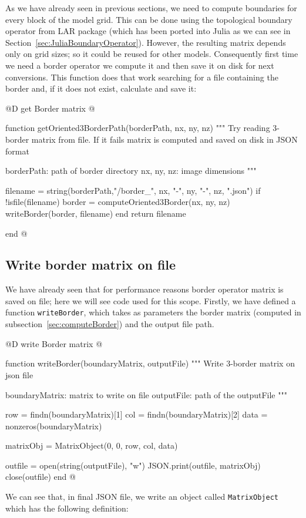 \documentclass[11pt,oneside]{article}	%
\begin{document}
As we have already seen in previous sections, we need to compute boundaries for every block of the model grid. This can be done using the topological boundary operator from LAR package (which has been ported into Julia as we can see in Section~\ref{sec:JuliaBoundaryOperator}). However, the resulting matrix depends only on grid sizes; so it could be reused for other models. Consequently first time we need a border operator we compute it and then save it on disk for next conversions. This function does that work searching for a file containing the border and, if it does not exist, calculate and save it: 

@D get Border matrix
@{function getOriented3BorderPath(borderPath, nx, ny, nz)
  """
  Try reading 3-border matrix from file. If it fails matrix
  is computed and saved on disk in JSON format

  borderPath: path of border directory
  nx, ny, nz: image dimensions
  """

  filename = string(borderPath,"/border_", nx, "-", ny, "-", nz, ".json")
  if !isfile(filename)
    border = computeOriented3Border(nx, ny, nz)
    writeBorder(border, filename)
  end
  return filename

end @}

\subsection{Write border matrix on file}\label{sec:writeBorderMatrix}

We have already seen that for performance reasons border operator matrix is saved on file; here we will see code used for this scope. Firstly, we have defined a function \texttt{writeBorder}, which takes as parameters the border matrix (computed in subsection~\ref{sec:computeBorder}) and the output file path. 

@D write Border matrix
@{function writeBorder(boundaryMatrix, outputFile)
  """
  Write 3-border matrix on json file

  boundaryMatrix: matrix to write on file
  outputFile: path of the outputFile
  """

  row = findn(boundaryMatrix)[1]
  col = findn(boundaryMatrix)[2]
  data = nonzeros(boundaryMatrix)

  matrixObj = MatrixObject(0, 0, row, col, data)

  outfile = open(string(outputFile), "w")
  JSON.print(outfile, matrixObj)
  close(outfile)
end @}

We can see that, in final JSON file, we write an object called \texttt{MatrixObject} which has the following definition:
\end{document}
